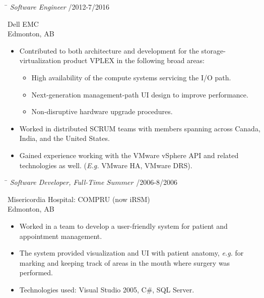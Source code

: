 \documentclass{res}
\begin{document}
\begin{resume}
    \vspace{-0.1in}
    \begin{tabbing}
    \hspace{5.15in}\= \kill  %
    \textit{Software Engineer} /2012-7/2016
    \end{tabbing}\vspace{-22pt}  %
    Dell EMC\\
    Edmonton, AB\\
    \vspace{-2.5ex}\begin{itemize}[noitemsep]
    \item Contributed to both architecture and development for the storage-virtualization product VPLEX in the following broad areas:
    \begin{itemize}[noitemsep]
    \item High availability of the compute systems servicing the I/O path.
    \item Next-generation management-path UI design to improve performance.
    \item Non-disruptive hardware upgrade procedures.
    \end{itemize}
    \item Worked in distributed SCRUM teams with members spanning across Canada, India, and the United States.
    \item Gained experience working with the VMware vSphere API and related technologies as well.  (\textit{E.g.} VMware HA, VMware DRS).
    \end{itemize}

    \vspace{-0.1in}
    \begin{tabbing}
    \hspace{5.15in}\= \kill  %
    \textit{Software Developer, Full-Time \(Summer\)} /2006-8/2006
    \end{tabbing}\vspace{-22pt}  %
    Misericordia Hospital: COMPRU (now iRSM)\\
    Edmonton, AB\\
    \vspace{-2.5ex}\begin{itemize}[noitemsep]
    \item Worked in a team to develop a user-friendly system for patient and appointment management.
    \item The system provided visualization and UI with patient anatomy, \textit{e.g.} for marking and keeping track of areas in the mouth where surgery was performed.
    \item Technologies used: Visual Studio 2005, C\#, SQL Server.
    \end{itemize}



\end{resume}
\end{document}
